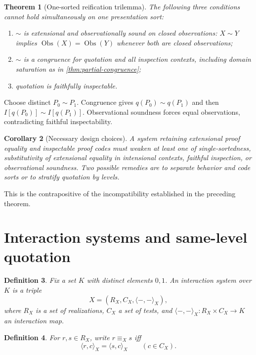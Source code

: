 \documentclass[12pt,a4paper,twoside]{extarticle}
\makeatletter
\theoremstyle{compactplain}
\newtheorem{theorem}{Theorem}[section]
\newtheorem{corollary}[theorem]{Corollary}
\theoremstyle{compactdef}
\newtheorem{definition}[theorem]{Definition}
\renewenvironment{proof}[1][\proofname]{\par\pushQED{\qed}\normalfont
  \topsep2pt\trivlist\item[\hskip\labelsep\bfseries #1\@addpunct{.}]\ignorespaces}
 {\popQED\endtrivlist\@endpefalse}
\makeatother
\begin{document}
\begin{theorem}[One-sorted reification trilemma]
The following three conditions cannot hold simultaneously on one presentation sort:
\begin{enumerate}[label=(\alph*)]
\item $\sim$ is extensional and observationally sound on closed observations: $X\sim Y$ implies $\operatorname{Obs}(X)=\operatorname{Obs}(Y)$ whenever both are closed observations;
\item $\sim$ is a congruence for quotation and all inspection contexts, including domain saturation as in \cref{thm:partial-congruence};
\item quotation is faithfully inspectable.
\end{enumerate}
\end{theorem}
\begin{proof}
Choose distinct $P_0\sim P_1$. Congruence gives $q(P_0)\sim q(P_1)$ and then $I[q(P_0)]\sim I[q(P_1)]$. Observational soundness forces equal observations, contradicting faithful inspectability.
\end{proof}

\begin{corollary}[Necessary design choices]
A system retaining extensional proof equality and inspectable proof codes must weaken at least one of single-sortedness, substitutivity of extensional equality in intensional contexts, faithful inspection, or observational soundness. Two possible remedies are to separate behavior and code sorts or to stratify quotation by levels.
\end{corollary}
\begin{proof}
This is the contrapositive of the incompatibility established in the preceding theorem.
\end{proof}
\section{Interaction systems and same-level quotation}\label{sec:interaction}

\begin{definition}
Fix a set $K$ with distinct elements $0,1$. An interaction system over $K$ is a triple
\[
X=(R_X,C_X,\langle-,-\rangle_X),
\]
where $R_X$ is a set of realizations, $C_X$ a set of tests, and $\langle-,-\rangle_X:R_X\times C_X\to K$ an interaction map.
\end{definition}

\begin{definition}
For $r,s\in R_X$, write $r\equiv_X s$ iff
\[
\langle r,c\rangle_X=\langle s,c\rangle_X\qquad(c\in C_X).
\]
\end{definition}
\end{document}
